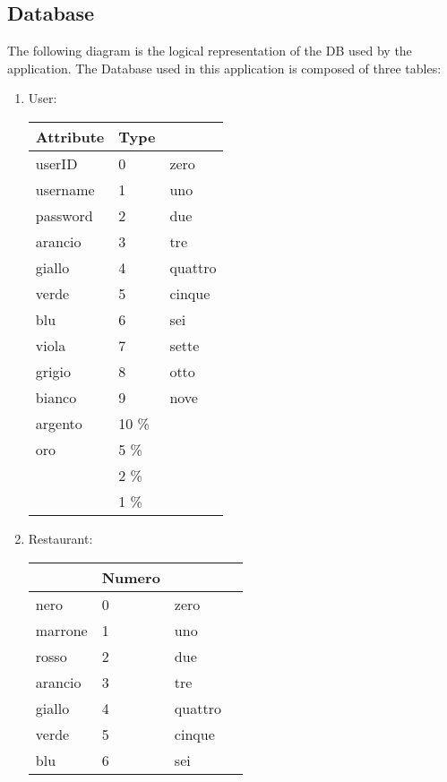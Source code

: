 \subsection {Database}
The following diagram is the logical representation of the DB used by the application.
The Database used in this application is composed of three tables:
\begin{enumerate}
	\item User:
\begin{tabular}{|l|l|l|}
\hline
	Attribute  & Type \\
\hline
userID            & 0     & zero          \\
username         & 1     & uno           \\
password           & 2     & due           \\
arancio        & 3     & tre           \\
giallo          & 4     & quattro       \\
verde           & 5     & cinque        \\
blu             & 6     & sei           \\
viola           & 7     & sette         \\
grigio          & 8     & otto          \\
bianco          & 9     & nove          \\
argento         & 10 \% &               \\
oro             & 5 \%  &               \\
                & 2 \%  &               \\
                & 1 \%  &               \\
\hline
\end{tabular}
\item Restaurant:
\begin{tabular}{|l|l|l|l|}
\hline
          & Numero        &       \\
\hline
nero            & 0     & zero          \\
marrone         & 1     & uno           \\
rosso           & 2     & due           \\
arancio         & 3     & tre           \\
giallo          & 4     & quattro       \\
verde           & 5     & cinque        \\
blu             & 6     & sei           \\

\end{tabular}
\end{enumerate}
